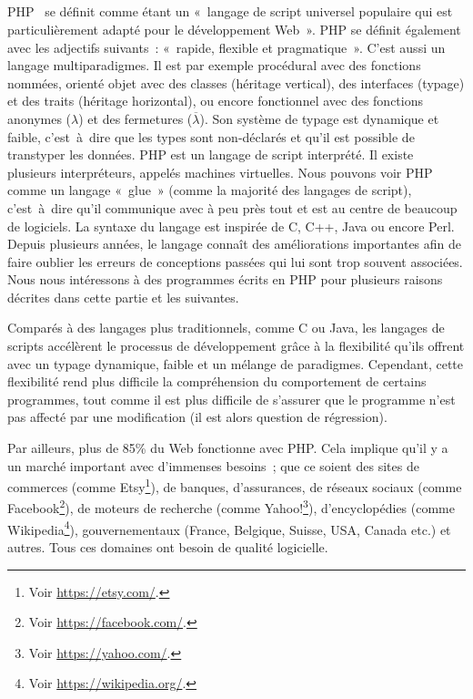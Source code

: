 \subsection{}

PHP~ se définit comme étant un «~langage de script universel
populaire qui est particulièrement adapté pour le développement Web~». PHP se
définit également avec les adjectifs suivants~: «~rapide, flexible et
pragmatique~». C'est aussi un langage multiparadigmes. Il est par exemple
procédural avec des fonctions nommées, orienté objet avec des classes (héritage
vertical), des interfaces (typage) et des traits (héritage horizontal), ou
encore fonctionnel avec des fonctions anonymes ($\lambda$) et des fermetures
($\overline{\lambda}$). Son système de typage est dynamique et faible,
c'est~à~dire que les types sont non-déclarés et qu'il est possible de transtyper
les données. PHP est un langage de script interprété. Il existe plusieurs
interpréteurs, appelés machines virtuelles. Nous pouvons voir PHP comme un
langage «~glue~» (comme la majorité des langages de script), c'est~à~dire qu'il
communique avec à peu près tout et est au centre de beaucoup de logiciels. La
syntaxe du langage est inspirée de C, C++, Java ou encore Perl.  Depuis
plusieurs années, le langage connaît des améliorations importantes afin de faire
oublier les erreurs de conceptions passées qui lui sont trop souvent associées.
Nous nous intéressons à des programmes écrits en PHP pour plusieurs raisons
décrites dans cette partie et les suivantes.

Comparés à des langages plus traditionnels, comme C ou Java, les langages de
scripts accélèrent le processus de développement grâce à la flexibilité qu'ils
offrent avec un typage dynamique, faible et un mélange de paradigmes. Cependant,
cette flexibilité rend plus difficile la compréhension du comportement de
certains programmes, tout comme il est plus difficile de s'assurer que le
programme n'est pas affecté par une modification (il est alors question de
régression).

Par ailleurs, plus de 85\% du Web fonctionne avec PHP. Cela implique qu'il y a
un marché important avec d'immenses besoins~; que ce soient des sites de
commerces (comme Etsy\footnote{Voir \url{https://etsy.com/}.}), de banques,
d'assurances, de réseaux sociaux (comme Facebook\footnote{Voir
\url{https://facebook.com/}.}), de moteurs de recherche (comme
Yahoo!\footnote{Voir \url{https://yahoo.com/}.}), d'encyclopédies (comme
Wikipedia\footnote{Voir \url{https://wikipedia.org/}.}), gouvernementaux
(France, Belgique, Suisse, USA, Canada etc.) et autres. Tous ces domaines ont
besoin de qualité logicielle.

